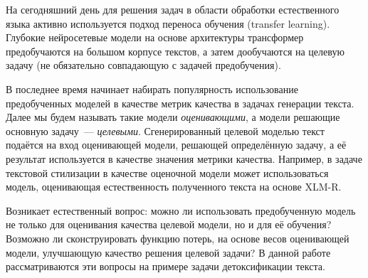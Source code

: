 

На сегодняшний день для решения задач в области обработки естественного языка активно используется подход переноса обучения (transfer learning). 
Глубокие нейросетевые модели на основе архитектуры трансформер \cite{gpt3, t5} предобучаются на большом корпусе текстов, а затем дообучаются на целевую задачу (не обязательно совпадающую с задачей предобучения). 

В последнее время начинает набирать популярность использование предобученных моделей в качестве метрик качества в задачах генерации текста. 
Далее мы будем называть такие модели \textit{оценивающими}, а модели решающие основную задачу~--- \textit{целевыми}. 
Сгенерированный целевой моделью текст подаётся на вход оценивающей модели, решающей определённую задачу, а её результат используется в качестве значения метрики качества. Например, в задаче текстовой стилизации в качестве оценочной модели может использоваться модель, оценивающая естественность полученного текста на основе XLM-R\cite{conneau2019unsupervised, briakou-etal-2021-evaluating}.

Возникает естественный вопрос: можно ли использовать предобученную модель не только для оценивания качества целевой модели, но и для её обучения? 
Возможно ли сконструировать функцию потерь, на основе весов оценивающей модели, улучшающую качество решения целевой задачи? 
В данной работе рассматриваются эти вопросы на примере задачи детоксификации текста.

